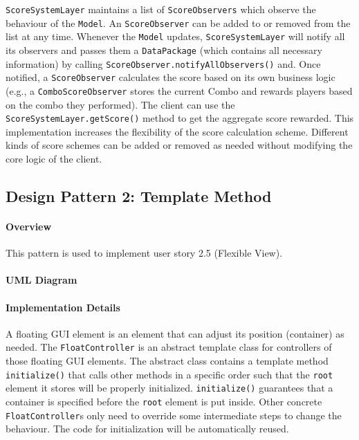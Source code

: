 \documentclass{article}
\begin{document}
\verb`ScoreSystemLayer` maintains a list of \verb`ScoreObservers` which observe the behaviour of the \verb`Model`. An \verb`ScoreObserver` can be added to or removed from the list at any time. Whenever the \verb`Model` updates, \verb`ScoreSystemLayer` will notify all its observers and passes them a \verb|DataPackage| (which contains all necessary information) by calling \verb`ScoreObserver.notifyAllObservers()` and. Once notified, a \verb`ScoreObserver` calculates the score based on its own business logic (e.g., a \verb`ComboScoreObserver` stores the current Combo and rewards players based on the combo they performed). The client can use the \verb`ScoreSystemLayer.getScore()` method to get the aggregate score rewarded. This implementation increases the flexibility of the score calculation scheme. Different kinds of score schemes can be added or removed as needed without modifying the core logic of the client.

\clearpage

\subsection{Design Pattern 2: Template Method}

\paragraph{Overview}
This pattern is used to implement user story 2.5 (Flexible View).

\paragraph{UML Diagram}\hfill

\begin{figure}[H]
    
\end{figure}

\paragraph{Implementation Details}

A floating GUI element is an element that can adjust its position (container) as needed. The \verb`FloatController` is an abstract template class for controllers of those floating GUI elements. The abstract class contains a template method \verb|initialize()| that calls other methods in a specific order such that the \verb|root| element it stores will be properly initialized. \verb|initialize()| guarantees that a container is specified before the \verb|root| element is put inside. Other concrete \verb|FloatController|s only need to override some intermediate steps to change the behaviour. The code for initialization will be automatically reused.
\end{document}
